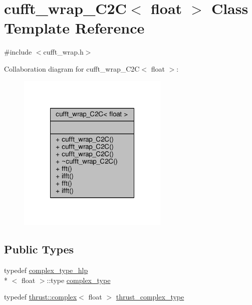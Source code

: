 \hypertarget{classcufft__wrap__C2C_3_01float_01_4}{\section{cufft\-\_\-wrap\-\_\-\-C2\-C$<$ float $>$ Class Template Reference}
\label{classcufft__wrap__C2C_3_01float_01_4}
}


{\ttfamily \#include $<$cufft\-\_\-wrap.\-h$>$}



Collaboration diagram for cufft\-\_\-wrap\-\_\-\-C2\-C$<$ float $>$\-:
\nopagebreak
\begin{figure}[H]
\begin{center}
\leavevmode
\includegraphics[width=204pt]{classcufft__wrap__C2C_3_01float_01_4__coll__graph}
\end{center}
\end{figure}
\subsection*{Public Types}
\begin{DoxyCompactItemize}
\item 
typedef \hyperlink{structcomplex__type__hlp}{complex\-\_\-type\-\_\-hlp}\\*
$<$ float $>$\-::type \hyperlink{classcufft__wrap__C2C_3_01float_01_4_a5774ab38d74ec0c5e5f7c8e9f077b9e9}{complex\-\_\-type}
\item 
typedef \hyperlink{test__deflation__typedefs_8h_a25cabcac5deb559feab415e2c445d8ba}{thrust\-::complex}$<$ float $>$ \hyperlink{classcufft__wrap__C2C_3_01float_01_4_a6a0bfa6274f9445666985b5aef65f6c3}{thrust\-\_\-complex\-\_\-type}
\end{DoxyCompactItemize}
